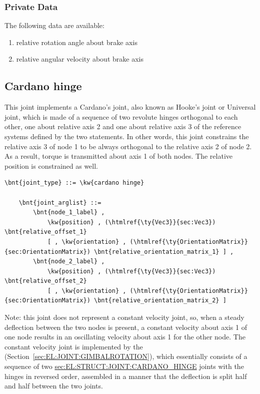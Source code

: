 \subsubsection{Private Data}
The following data are available:
\begin{enumerate}
\item {} relative rotation angle about brake axis
\item {} relative angular velocity about brake axis
\end{enumerate}




\subsection{Cardano hinge}
\label{sec:EL:STRUCT:JOINT:CARDANO_HINGE}
This joint implements a Cardano's joint, also known as Hooke's joint
or Universal joint, which is made of a sequence
of two revolute hinges orthogonal to each other, one about relative axis 2
and one about relative axis 3 of the reference systems
defined by the two  %
statements.
In other words, this joint constrains the relative axis 3 of node 1 
to be always orthogonal to the relative axis 2 of node 2.
As a result, torque is transmitted about axis 1 of both nodes.
The relative position is constrained as well.
\begin{Verbatim}[commandchars=\\\{\}]
    \bnt{joint_type} ::= \kw{cardano hinge}

    \bnt{joint_arglist} ::= 
        \bnt{node_1_label} ,
            \kw{position} , (\htmlref{\ty{Vec3}}{sec:Vec3}) \bnt{relative_offset_1}
            [ , \kw{orientation} , (\htmlref{\ty{OrientationMatrix}}{sec:OrientationMatrix}) \bnt{relative_orientation_matrix_1} ] ,
        \bnt{node_2_label} ,
            \kw{position} , (\htmlref{\ty{Vec3}}{sec:Vec3}) \bnt{relative_offset_2}
            [ , \kw{orientation} , (\htmlref{\ty{OrientationMatrix}}{sec:OrientationMatrix}) \bnt{relative_orientation_matrix_2} ]
\end{Verbatim}
Note: this joint does not represent a constant velocity joint,
so, when a steady deflection between the two nodes is present,
a constant velocity about axis 1 of one node results in an oscillating
velocity about axis 1 for the other node.
The constant velocity joint is implemented by the 
(Section~\ref{sec:EL:JOINT:GIMBALROTATION}), which essentially consists
of a sequence of two
\hyperref{\kw{cardano hinge}}{\kw{cardano hinge} (see Section~}{)}{sec:EL:STRUCT:JOINT:CARDANO_HINGE}
joints with the hinges in reversed order, assembled
in a manner that the deflection is split half and half
between the two joints.

